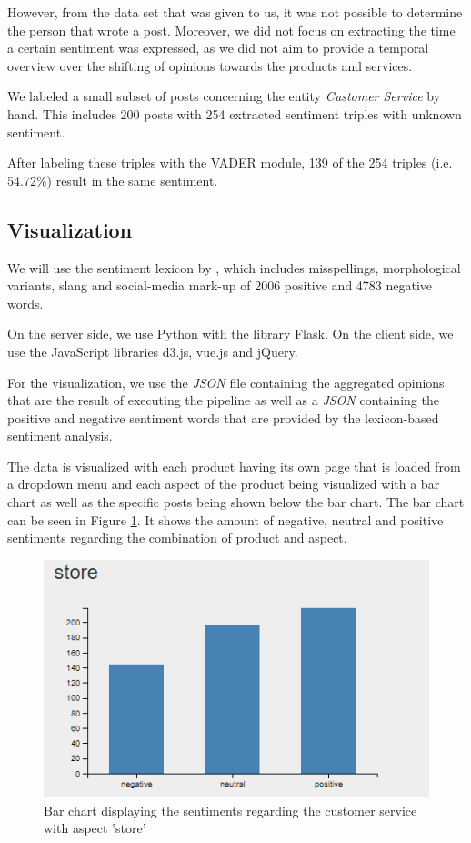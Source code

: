 \documentclass[10pt,a4paper]{article}
\begin{document}
	However, from the data set that was given to us, it was not possible to determine the person that wrote a post. Moreover, we did not focus on extracting the time a certain sentiment was expressed, as we did not aim to provide a temporal overview over the shifting of opinions towards the products and services. 

	We labeled a small subset of posts concerning the entity \textit{Customer Service} by hand. This includes 200 posts with 254 extracted sentiment triples with unknown sentiment.

	After labeling these triples with the VADER module, 139 of the 254 triples (i.e. 54.72\%) result in the same sentiment.

		\subsection{Visualization}
		We will use the sentiment lexicon by \cite{Hu:2004:MSC:1014052.1014073}, which includes misspellings, morphological variants, slang and social-media mark-up of 2006 positive and 4783 negative words.

		On the server side, we use Python with the library Flask. On the client side, we use the JavaScript libraries d3.js, vue.js and jQuery.
	
		For the visualization, we use the \textit{JSON} file containing the aggregated opinions that are the result of executing the pipeline as well as a \textit{JSON} containing the positive and negative sentiment words that are provided by the lexicon-based sentiment analysis.
	
		The data is visualized with each product having its own page that is loaded from a dropdown menu and each aspect of the product being visualized with a bar chart as well as the specific posts being shown below the bar chart. The bar chart can be seen in Figure \ref{fig:barchart}. It shows the amount of negative, neutral and positive sentiments regarding the combination of product and aspect.
	
		\begin{figure}[h]
			\centering
			\includegraphics[width=0.7\linewidth]{data/barchart}
			\caption{Bar chart displaying the sentiments regarding the customer service with aspect 'store'}
			\label{fig:barchart}
		\end{figure}
			
\end{document}

